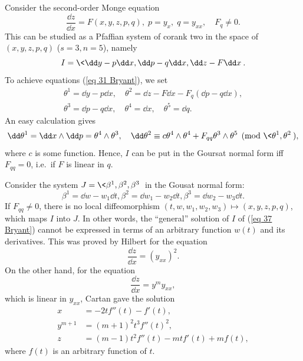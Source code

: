 \begin{example}
    Consider the second-order Monge equation 
    \[\frac{\dd z}{\dd x}=F(x,y,z,p,q),\; p=y_x, \; q=y_{xx},\quad F_q\neq 0.\label{eq 37 Bryant}\]
    This can be studied as a Pfaffian system of corank two in the space of $(x,y,z,p,q)$ ($s=3,n=5$), namely 
    \[I=\<\dd y-p\dd x,\dd p-q\dd x,\dd z-F\dd x\>.\]
    To achieve equations (\ref{eq 31 Bryant}), we set 
    \begin{align}
        \theta^1=\dd y-p\dd x,\quad \theta^2=\dd z-F\dd x-F_q (\dd p- q\dd x),\\
        \theta^3=\dd p-q\dd x,\quad  \theta^4=\dd x,\quad \theta^5=\dd q.
    \end{align}
    An easy calculation gives 
    \[\dd\theta^1=\dd x\wedge\dd p=\theta^4\wedge\theta^3,\quad \dd\theta^2\equiv c\theta^4\wedge\theta^4+F_{qq}\theta^3\wedge\theta^5\pmod{\<\theta^1,\theta^2\>},\]
    where $c$ is some function. Hence, $I$ can be put in the Goursat normal form iff $F_{qq}=0$, i.e.\ if $F$ is linear in $q$.
    
    Consider the system $J=\<\beta^1,\beta^2,\beta^3\>$ in the Gousat normal form:
    \[\beta^1=\dd w-w_1\dd t,\beta^2=\dd w_1-w_2\dd t, \beta^3=\dd w_2-w_3\dd t.\]
    If $F_{qq}\neq 0$, there is no local diffeomorphism $(t,w,w_1,w_2,w_3)\mapsto (x,y,z,p,q)$, which maps $I$ into $J$. In other words, the ``general'' solution of $I$ of (\ref{eq 37 Bryant}) cannot be expressed in terms of an arbitrary function $w(t)$ and its derivatives. This was proved by Hilbert for the equation 
    \[\frac{\dd z}{\dd x}=(y_{xx})^2.\]
    On the other hand, for the equation 
    \[\frac{\dd z}{\dd x}=y^m y_{xx},\]
    which is linear in $y_{xx}$, Cartan gave the solution 
    \begin{align}
        x&= -2tf''(t)-f'(t),\\
        y^{m+1}&=(m+1)^2 t^3 f''(t)^2,\\
        z&=(m-1)t^2 f''(t)-mtf'(t)+mf(t),
    \end{align}
    where $f(t)$ is an arbitrary function of $t$. 
\end{example}

